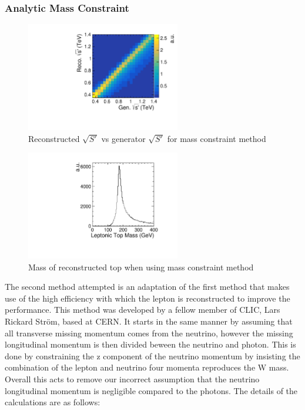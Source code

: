 \subsubsection{Analytic Mass Constraint}

\begin{figure}
  \centering
  \includegraphics[width=0.6\textwidth]{TopAnalysis/figures/AnalEVsTrueE.pdf}
  \caption[Reconstructed $\sqrt{S'}$ vs generator $\sqrt{S'}$ for mass constraint method]{Reconstructed $\sqrt{S'}$ vs generator $\sqrt{S'}$ for mass constraint method}
  \label{fig:MassConstraint}
\end{figure}
\begin{figure}
  \centering
  \includegraphics[width=0.6\textwidth]{TopAnalysis/figures/AnalTopMass.pdf}
  \caption[Mass of reconstructed leptonic top when using mass constraint method]{Mass of reconstructed top when using mass constraint method}
  \label{fig:TopMassFrommassMethod}
\end{figure}

The second method attempted is an adaptation of the first method that makes use of the high efficiency with which the lepton is reconstructed to improve the performance. This method was developed by a fellow member of \ac{CLIC}, Lars Rickard Str{\"o}m, based at \ac{CERN}. It starts in the same manner by assuming that all transverse missing momentum comes from the neutrino, however the missing longitudinal momentum is then divided beween the neutrino and photon. This is done by constraining the z component of the neutrino momentum by insisting the combination of the lepton and neutrino four momenta reproduces the W mass. Overall this acts to remove our incorrect assumption that the neutrino longitudinal momentum is negligible compared to the photons. The details of the calculations are as follows:

